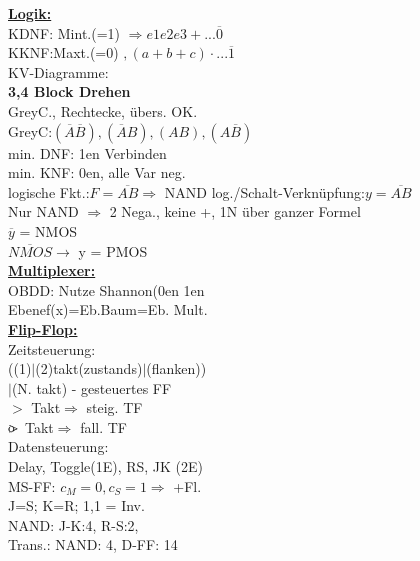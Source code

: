 \documentclass[11pt]{article}
\begin{document}
\begin{minipage}{0.33\textwidth}


\underline{\textbf{Logik:}}\\
KDNF: Mint.(=1) $\Rightarrow e1e2e3 + ...\overline{0}$\\
KKNF:Maxt.(=0) $, (a+b+c) \cdot ...\overline{1}$\\
KV-Diagramme:\\ 
\textbf{3,4 Block Drehen}\\
GreyC., Rechtecke, übers. OK.\\
GreyC:$(\overline{A} \overline{B}), (\overline{A}B), (AB), (A\overline{B})$\\
min. DNF: 1en Verbinden\\
min. KNF: 0en, alle Var neg.\\
logische Fkt.:$F = \overline{AB} \Rightarrow $ NAND
log./Schalt-Verknüpfung:$y = \overline{AB} $\\
Nur NAND $\Rightarrow$ 2 Nega., keine +, 1N über ganzer Formel\\
$\overline{y}$ = NMOS\\
$\overline{NMOS} \rightarrow$ y = PMOS\\


\underline{\textbf{Multiplexer:}}\\
OBDD: Nutze Shannon(0en 1en\\
Ebenef(x)=Eb.Baum=Eb. Mult.\\

\vspace{3cm}
\underline{\textbf{Flip-Flop:}}\\
Zeitsteuerung:\\ ((1)$|$(2)takt(zustands)$|$(flanken))\\$|$(N. takt) - gesteuertes FF\\
$>$ Takt$\Rightarrow$ steig. TF\\
$\rlap{o}{>}$ Takt$\Rightarrow$ fall. TF\\
Datensteuerung:\\ Delay, Toggle(1E), RS, JK (2E)\\
MS-FF: $c_M=0,c_S=1 \Rightarrow$ +Fl.\\
J=S; K=R; 1,1 = Inv.\\
NAND: J-K:4, R-S:2,\\
Trans.: NAND: 4, D-FF: 14\\



\end{minipage}
~~~~~~~
\end{document}
